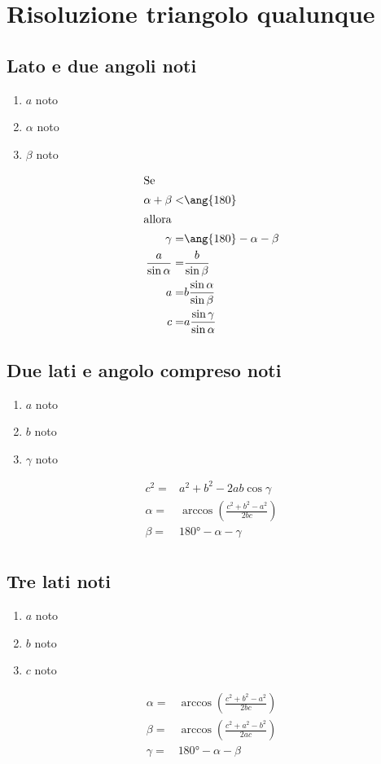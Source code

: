 \section{Risoluzione triangolo qualunque}
\begin{center}
	
\end{center}
\subsection{Lato e  due angoli noti}
\begin{enumerate}
	\item $a$ noto
	\item $\alpha$ noto
	\item $\beta$ noto
\end{enumerate}
\begin{align*}
\intertext{Se}
\alpha+\beta<&\ang{180}\\
\intertext{allora}
\gamma=&\ang{180}-\alpha-\beta\\
\frac{a}{\sin\alpha}=&\frac{b}{\sin\beta}\\
a=&b\frac{\sin\alpha}{\sin\beta}\\
c=&a\frac{\sin\gamma}{\sin\alpha}
\end{align*}
\subsection{Due lati e angolo compreso noti}
\begin{enumerate}
	\item $a$ noto
	\item $b$ noto
	\item $\gamma$ noto
\end{enumerate}
\begin{align*}
c^2=&a^2+b^2-2ab\cos\gamma\\
\alpha=&\arccos\left(\frac{c^2+b^2-a^2}{2bc} \right)\\
\beta=&\ang{180}-\alpha-\gamma\\
\end{align*}
\subsection{Tre lati noti}
\begin{enumerate}
	\item $a$ noto
	\item $b$ noto
	\item $c$ noto
\end{enumerate}
\begin{align*}
\alpha=&\arccos\left(\frac{c^2+b^2-a^2}{2bc} \right)\\
\beta=&\arccos\left(\frac{c^2+a^2-b^2}{2ac} \right)\\
\gamma=&\ang{180}-\alpha-\beta\\
\end{align*}
